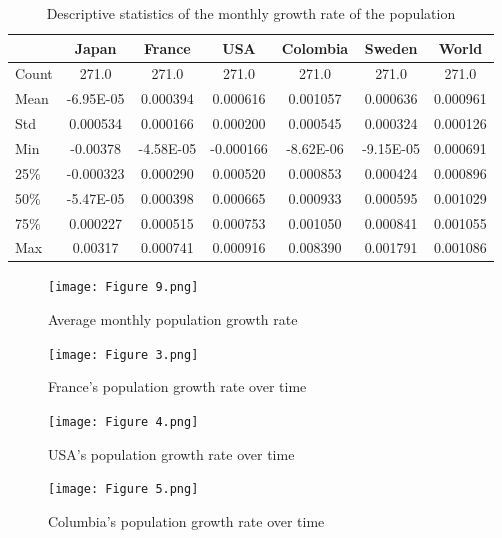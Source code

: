 \documentclass[hidelinks,11pts]{article}
\DeclareMathOperator{\1}{\mathbbm{1}}
\begin{document}
\begin{table}[htbp]
  \centering
  \caption{{Descriptive statistics of the monthly growth rate of the population}}
  \begin{tabular}{lcccccc}
    \toprule
    & Japan & France & USA & Colombia & Sweden & World \\
    \midrule
    Count & 271.0 & 271.0 & 271.0 & 271.0 & 271.0 & 271.0 \\
    Mean & -6.95E-05 & 0.000394 & 0.000616 & 0.001057 & 0.000636 & 0.000961 \\
    Std & 0.000534 & 0.000166 & 0.000200 & 0.000545 & 0.000324 & 0.000126 \\
    Min & -0.00378 & -4.58E-05 & -0.000166 & -8.62E-06 & -9.15E-05 & 0.000691 \\
    25\% & -0.000323 & 0.000290 & 0.000520 & 0.000853 & 0.000424 & 0.000896 \\
    50\% & -5.47E-05 & 0.000398 & 0.000665 & 0.000933 & 0.000595 & 0.001029 \\
    75\% & 0.000227 & 0.000515 & 0.000753 & 0.001050 & 0.000841 & 0.001055 \\
    Max & 0.00317 & 0.000741 & 0.000916 & 0.008390 & 0.001791 & 0.001086 \\
    \bottomrule
  \end{tabular}
  \label{tab:desc2}
\end{table}


\begin{figure}
    \centering
    \texttt{[image: Figure 9.png]}
    \caption{Average monthly population growth rate }
    \label{fig:enter-label}
\end{figure}


\begin{figure}
    \centering
    \texttt{[image: Figure 3.png]}
    \caption{France's population growth rate over time}
    \label{fig:enter-label}
\end{figure}

\begin{figure}
    \centering
    \texttt{[image: Figure 4.png]}
    \caption{USA's population growth rate over time}
    \label{fig:enter-label}
\end{figure}

\begin{figure}
    \centering
    \texttt{[image: Figure 5.png]}
    \caption{Columbia's population growth rate over time}
    \label{fig:enter-label}
\end{figure}
\end{document}
